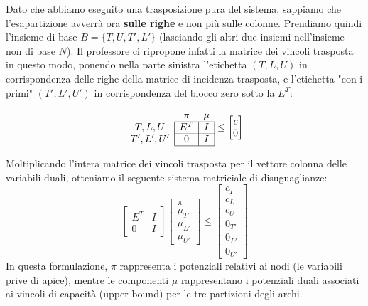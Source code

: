 \documentclass[12pt, a4paper]{article}
\begin{document}
	Dato che abbiamo eseguito una trasposizione pura del sistema, sappiamo che l'esapartizione avverrà ora \textbf{sulle righe} e non più sulle colonne. Prendiamo quindi l'insieme di base $B = \{T, U, T', L'\}$ (lasciando gli altri due insiemi nell'insieme non di base $N$).
	Il professore ci ripropone infatti la matrice dei vincoli trasposta in questo modo, ponendo nella parte sinistra l'etichetta $(T, L, U)$ in corrispondenza delle righe della matrice di incidenza trasposta, e l'etichetta "con i primi" $(T', L', U')$ in corrispondenza del blocco zero sotto la $E^T$:
	
	\[
	\begin{array}{c|c|c|}
		\multicolumn{1}{c}{} & \multicolumn{1}{c}{\pi} & \multicolumn{1}{c}{\mu} \\
		\cline{2-3}
		T, L, U & E^T & I \\
		\cline{2-3}
		T', L', U' & 0 & I \\
		\cline{2-3}
	\end{array}
	\le
	\begin{bmatrix}
		c \\
		0
	\end{bmatrix}
	\]
	
	Moltiplicando l'intera matrice dei vincoli trasposta per il vettore colonna delle variabili duali, otteniamo il seguente sistema matriciale di disuguaglianze:
	\[
	\begin{bmatrix}
		E^T & I \\
		0 & I
	\end{bmatrix}
	\begin{bmatrix}
		\pi \\
		\mu_{T'} \\
		\mu_{L'} \\
		\mu_{U'}
	\end{bmatrix}
	\le
	\begin{bmatrix}
		c_T \\
		c_L \\
		c_U \\
		0_{T'} \\
		0_{L'} \\
		0_{U'}
	\end{bmatrix}
	\]
	In questa formulazione, $\pi$ rappresenta i potenziali relativi ai nodi (le variabili prive di apice), mentre le componenti $\mu$ rappresentano i potenziali duali associati ai vincoli di capacità (upper bound) per le tre partizioni degli archi.
	
\end{document}
